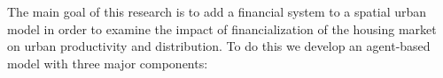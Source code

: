 




The main goal of this research is to add a financial system to a spatial urban model %
in order to examine the impact of financialization of the housing market on urban productivity and distribution. To do this we develop an \gls{agent-based model} with three major components: 

